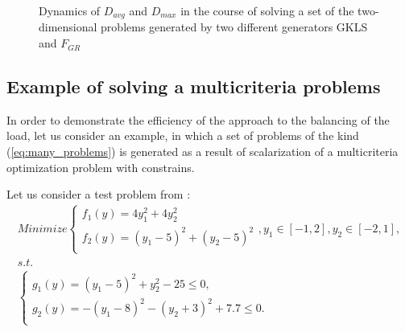 \documentclass[runningheads]{llncs}
\begin{document}
\begin{figure}[ht]
    \centering
    \caption{Dynamics of \(D_{avg}\) and \(D_{max}\) in the course of solving a set of the two-
dimensional problems generated by two different generators GKLS and \(F_{GR}\)}
    \label{fig:devs_mixed}
\end{figure}

\subsection{Example of solving a multicriteria problems}

In order to demonstrate the efficiency of the approach to the balancing of the load, let us
consider an example, in which a set of problems of the kind (\ref{eq:many_problems}) is
generated as a result of scalarization of a multicriteria optimization problem with constrains.

Let us consider a test problem from \cite{BinhKorn1999}:
\begin{equation}
  \label{eq:mco_probem}
  \begin{array}{l}
      Minimize \left \{
      \begin{array}{l}
        f_1(y) = 4 y_1^2 + 4 y_2^2 \\
        f_2(y) = (y_1-5)^2 + (y_2-5)^2 \\
      \end{array}
      \right .
      , y_1\in [-1,2],y_2\in [-2,1],
      \\s.t.
      \\
      \left \{
      \begin{array}{l}
        g_1(y) = (y_1 - 5)^2 + y_2^2 - 25 \leqslant 0, \\
        g_2(y) = -(y_1 - 8)^2 - (y_2 + 3)^2 + 7.7 \leqslant 0.\\
      \end{array}
      \right .
  \end{array}
\end{equation}
\end{document}
